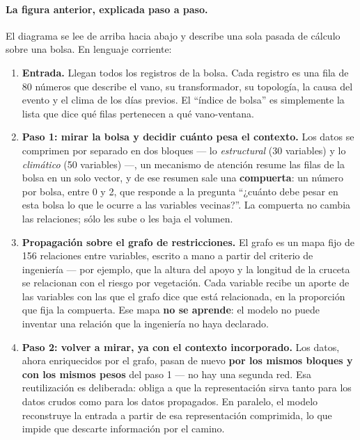 \documentclass[11pt,a4paper]{article}
\begin{document}
\begin{bloquenuevo}
\paragraph{La figura anterior, explicada paso a paso.} El diagrama se lee de arriba hacia
abajo y describe una sola pasada de cálculo sobre una bolsa. En lenguaje corriente:

\begin{enumerate}[itemsep=0.3em]
  \item \textbf{Entrada.} Llegan todos los registros de la bolsa. Cada registro es una fila de
        80 números que describe el vano, su transformador, su topología, la causa del evento y
        el clima de los días previos. El ``índice de bolsa'' es simplemente la lista que dice
        qué filas pertenecen a qué vano-ventana.

  \item \textbf{Paso 1: mirar la bolsa y decidir cuánto pesa el contexto.} Los datos se
        comprimen por separado en dos bloques --- lo \emph{estructural} (30 variables) y lo
        \emph{climático} (50 variables) ---, un mecanismo de atención resume las filas de la
        bolsa en un solo vector, y de ese resumen sale una \textbf{compuerta}: un número por
        bolsa, entre 0 y 2, que responde a la pregunta ``¿cuánto debe pesar en esta bolsa lo
        que le ocurre a las variables vecinas?''. La compuerta no cambia las relaciones; sólo
        les sube o les baja el volumen.

  \item \textbf{Propagación sobre el grafo de restricciones.} El grafo es un mapa fijo de 156
        relaciones entre variables, escrito a mano a partir del criterio de ingeniería --- por
        ejemplo, que la altura del apoyo y la longitud de la cruceta se relacionan con el
        riesgo por vegetación. Cada variable recibe un aporte de las variables con las que el
        grafo dice que está relacionada, en la proporción que fija la compuerta. Ese mapa
        \textbf{no se aprende}: el modelo no puede inventar una relación que la ingeniería no
        haya declarado.

  \item \textbf{Paso 2: volver a mirar, ya con el contexto incorporado.} Los datos, ahora
        enriquecidos por el grafo, pasan de nuevo \textbf{por los mismos bloques y con los
        mismos pesos} del paso 1 --- no hay una segunda red. Esa reutilización es deliberada:
        obliga a que la representación sirva tanto para los datos crudos como para los datos
        propagados. En paralelo, el modelo reconstruye la entrada a partir de esa
        representación comprimida, lo que impide que descarte información por el camino.


\end{enumerate}
\end{bloquenuevo}
\end{document}
